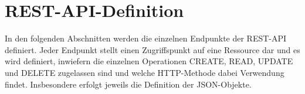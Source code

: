 \chapter{REST-API-Definition}
\label{sec:RESTAPIDefinition}

In den folgenden Abschnitten werden die einzelnen Endpunkte der REST-API definiert.
Jeder Endpunkt stellt einen Zugriffspunkt auf eine Ressource dar und es wird definiert, inwiefern die einzelnen Operationen CREATE, READ, UPDATE und DELETE zugelassen sind und welche HTTP-Methode dabei Verwendung findet.
Insbesondere erfolgt jeweils die Definition der JSON-Objekte.






